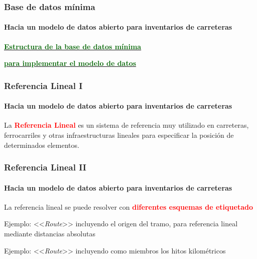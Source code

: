 \documentclass[aspectratio = 169, 12pt]{beamer}
\begin{document}
\begin{frame}
	\frametitle{Base de datos mínima}
	\framesubtitle{Hacia un modelo de datos abierto para inventarios de carreteras}

\begin{center}
	\textbf{\underline{\textcolor{darkgreen}{Estructura de la base de datos mínima}}}

	\textbf{\underline{\textcolor{darkgreen}{para implementar el modelo de datos}}}

	\vspace{2em}
\end{center}
\end{frame}


\begin{frame}
	\frametitle{Referencia Lineal I}
	\framesubtitle{Hacia un modelo de datos abierto para inventarios de carreteras}
	La \textcolor{red}{\textbf{Referencia Lineal}} es un sistema de referencia muy utilizado en carreteras, ferrocarriles y otras infraestructuras lineales para especificar la posición de determinados elementos.

	\vspace{1em}
	\begin{center}

		\vspace{1em}
	\end{center}
\end{frame}

\begin{frame}
	\frametitle{Referencia Lineal II}
	\framesubtitle{Hacia un modelo de datos abierto para inventarios de carreteras}
	La referencia lineal se puede resolver con \textcolor{red}{\textbf{diferentes esquemas de etiquetado}}

	\vspace{1em}
	\begin{center}

		\tiny{Ejemplo: <<\textit{Route}>> incluyendo el origen del tramo, para referencia lineal mediante distancias absolutas}

		\vspace{2em}

		\tiny{Ejemplo: <<\textit{Route}>> incluyendo como miembros los hitos kilométricos}
	\end{center}
\end{frame}
\end{document}
